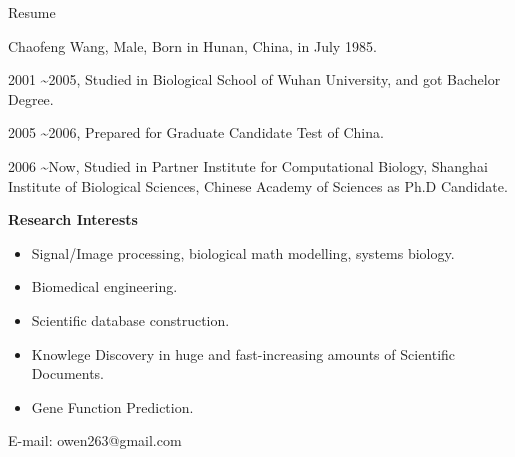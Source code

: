 
\begin{wcfChaps}{Resume}


Chaofeng Wang, Male, Born in Hunan, China, in July 1985.

% 
2001 \textasciitilde 2005, Studied in Biological School of Wuhan University, and got Bachelor Degree.

2005 \textasciitilde 2006, Prepared for Graduate Candidate Test of China.

2006 \textasciitilde Now, Studied in Partner Institute for Computational Biology, Shanghai Institute of Biological Sciences, Chinese Academy of Sciences as Ph.D Candidate.




\vspace{0.1in}
\textbf{Research Interests}
\begin{itemize}
\item Signal/Image processing, biological math modelling, systems biology.
\item Biomedical engineering.
\item Scientific database construction.
\item Knowlege Discovery in huge and fast-increasing amounts of Scientific Documents.
\item Gene Function Prediction. 
\end{itemize}

% 
% 

E-mail: owen263@gmail.com


\end{wcfChaps}
